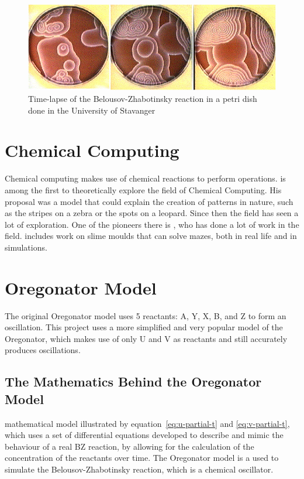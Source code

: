 \begin{figure}[H]
    \centering
    \includegraphics[width=0.75\linewidth]{images/BZWaves.jpg}
    \caption{Time-lapse of the Belousov-Zhabotinsky reaction in a petri dish done in the University of Stavanger}
    \label{fig:bz-reaction-pattern}
\end{figure}

\section{Chemical Computing}
Chemical computing makes use of chemical reactions to perform operations. 
\cite{Turing1952} is among the first to theoretically explore the field of Chemical Computing. 
His proposal was a model that could explain the creation of patterns in nature, such as the stripes on a zebra or the spots on a leopard.
Since then the field has seen a lot of exploration. One of the pioneers there is \cite{adamatzky2005reaction}, who has done a lot of work in the field. 
\cite{adamatzky2019brief} includes work on slime moulds that can solve mazes, both in real life and in simulations.

\section{Oregonator Model} 
The original Oregonator model uses 5 reactants: A, Y, X, B, and Z to form an oscillation. This project uses a more simplified and very popular model of the Oregonator, which makes use of only U and V as reactants and still accurately produces oscillations. 
\subsection{The Mathematics Behind the Oregonator Model}\label{sec:oregonator-math}
\cite{field2007oregonator} mathematical model illustrated by equation~\ref{eq:u-partial-t} and \ref{eq:v-partial-t}, which uses a set of differential equations developed to describe and mimic the behaviour of a real BZ reaction, by allowing for the calculation of the concentration of the reactants over time.
The Oregonator model is a used to simulate the Belousov-Zhabotinsky reaction, which is a chemical oscillator.

